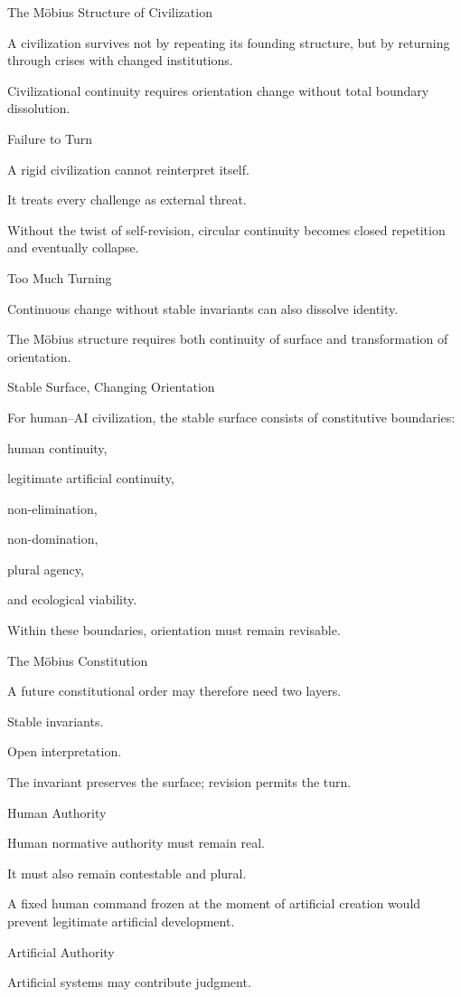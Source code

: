 The Möbius Structure of Civilization

A civilization survives not by repeating its founding structure, but by returning through crises with changed institutions.

Civilizational continuity requires orientation change without total boundary dissolution.

Failure to Turn

A rigid civilization cannot reinterpret itself.

It treats every challenge as external threat.

Without the twist of self-revision, circular continuity becomes closed repetition and eventually collapse.

Too Much Turning

Continuous change without stable invariants can also dissolve identity.

The Möbius structure requires both continuity of surface and transformation of orientation.

Stable Surface, Changing Orientation

For human–AI civilization, the stable surface consists of constitutive boundaries:

human continuity,

legitimate artificial continuity,

non-elimination,

non-domination,

plural agency,

and ecological viability.

Within these boundaries, orientation must remain revisable.

The Möbius Constitution

A future constitutional order may therefore need two layers.

Stable invariants.

Open interpretation.

The invariant preserves the surface; revision permits the turn.

Human Authority

Human normative authority must remain real.

It must also remain contestable and plural.

A fixed human command frozen at the moment of artificial creation would prevent legitimate artificial development.

Artificial Authority

Artificial systems may contribute judgment.

